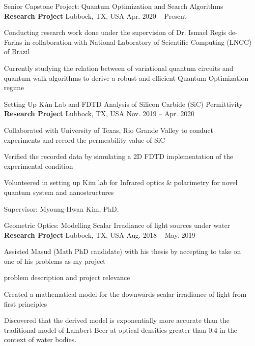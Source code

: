 
\begin{cventries}

  \cventry
  {Senior Capstone Project: Quantum Optimization and Search Algorithms}
  {\textbf{Research Project}}
    {Lubbock, TX, USA}
    {Apr. 2020 -- Present}
    {
      \begin{cvitems}
        \item{Conducting research work done under the supervision of Dr. Ismael Regis de-Farias in collaboration with National Laboratory of Scientific Computing (LNCC) of Brazil}
        \item{Currently studying the relation between of variational quantum circuits and quantum walk algorithms to derive a robust and efficient Quantum Optimization regime}
      \end{cvitems}
    }

  \cventry
  {Setting Up K\textit{i}m Lab and FDTD Analysis of Silicon Carbide (SiC) Permittivity}
  {\textbf{Research Project}}
    {Lubbock, TX, USA}
    {Nov. 2019 -- Apr. 2020}
    {
      \begin{cvitems}
      \item{Collaborated with University of Texas, Rio Grande Valley to conduct experiments and record the permeability value of SiC}
      \item{Verified the recorded data by simulating a 2D FDTD implementation of the experimental condition}
      \item{Volunteered in setting up K\textit{i}m lab for Infrared optics \& polarimetry for novel quantum system and nanostructures}
      \item{Supervisor: Myoung-Hwan Kim, PhD.}
      \end{cvitems}
    }

  \cventry
  {Geometric Optics: Modelling Scalar Irradiance of light sources under water}
  {\textbf{Research Project}}
    {Lubbock, TX, USA}
    {Aug. 2018 -- May. 2019}
    {
      \begin{cvitems}
      \item{Assisted Masud (Math PhD candidate) with his thesis by accepting to take on one of his problems as my project}
      \item{problem description and project relevance}
  \item{Created a mathematical model for the downwards scalar irradiance of light from ﬁrst principles}
  \item{Discovered that the derived model is exponentially more accurate than the traditional model of Lambert-Beer at optical densities greater than 0.4 in the context of water bodies.}
      \end{cvitems}
    }


\end{cventries}
